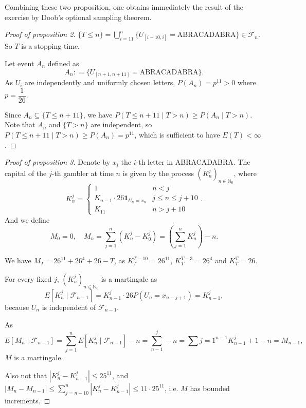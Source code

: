 \documentclass{article}
\begin{document}
    Combining these two proposition,
    one obtains immediately the result of the exercise
    by Doob's optional sampling theorem.

    \begin{proof}[Proof of proposition 2]
      $\{T \leq n\} = \bigcup\limits_{i=11}^n\{U_{[i-10, i]} = \text{ABRACADABRA}\} \in \mathcal F_n$.
      So $T$ is a stopping time.

      Let event $A_n$ defined as
      $$A_n \mathrel{\mathop:}= \{U_{[n+1, n+11]} = \text{ABRACADABRA}\}.$$
      As $U_i$ are independently and uniformly chosen letters, $P(A_n) = p^{11} > 0$ where $p = \dfrac{1}{26}$.

      Since $A_n \subseteq \{T \leq n + 11\}$,
      we have $P(T \leq n + 11 \mid T > n) \geq P(A_n \mid T > n)$.
      Note that $A_n$ and $\{T > n\}$ are independent,
      so $P(T \leq n+11 \mid T > n) \geq P(A_n) = p^{11}$,
      which is sufficient to have $E(T) < \infty$.
    \end{proof}

    \begin{proof}[Proof of proposition 3]
      Denote by $x_i$ the $i$-th letter in ABRACADABRA.
      The capital of the $j$-th gambler at time $n$ is given by the process $(K^j_n)_{n \in \mathbb N_0}$,
      where
      $$K^j_n = \begin{cases}
        1 & n < j\\
        K_{n-1} \cdot 26 \mathbf{1}_{U_n = x_n} & j \leq n \leq j + 10\\
        K_{11} & n > j + 10
      \end{cases}.$$
      And we define
      $$M_0 = 0, \quad M_n = \sum\limits_{j=1}^n(K^j_n - K^j_0) = (\sum\limits_{j=1}^n K^j_n) - n.$$

      We have $M_T = 26^{11} + 26^4 + 26 - T$,
      as $K_T^{T-10} = 26^{11}$, $K_T^{T-3} = 26^4$ and $K_T^T = 26$.

      For every fixed $j$, $(K_n^j)_{n \in \mathbb N_0}$ is a martingale as
      $$E[K_n^j \mid \mathcal F_{n-1}] = K_{n-1}^j \cdot 26 P(U_n = x_{n-j+1}) = K_{n-1}^j,$$
      because $U_n$ is independent of $\mathcal F_{n-1}$.

      As
      $$E[M_n \mid \mathcal F_{n-1}] = \sum\limits_{j=1}^n E[K_n^j \mid \mathcal F_{n-1}] - n = \sum\limits_{n-1}^j - n = \sum\limits{j=1}^{n-1}K_{n-1}^j + 1 - n = M_{n-1},$$
      $M$ is a martingale.

      Also not that $|K_n^j - K_{n-1}^j| \leq 25^{11}$,
      and $|M_n - M_{n-1}| \leq \sum\limits_{j=n-10}^n |K_n^j - K_{n-1}^j | \leq 11 \cdot 25^{11}$,
      i.e. $M$ has bounded increments.
    \end{proof}
\end{document}
